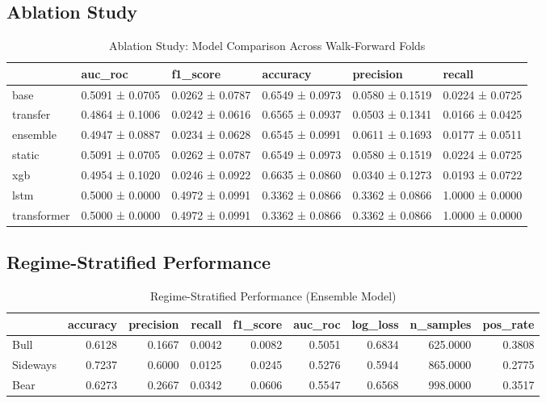 \documentclass[12pt,a4paper]{article}
\begin{document}
\subsection{Ablation Study}

\begin{table}
\caption{Ablation Study: Model Comparison Across Walk-Forward Folds}
\label{tab:ablation}
\begin{tabular}{llllll}
\toprule
 & auc_roc & f1_score & accuracy & precision & recall \\
\midrule
base & 0.5091 ± 0.0705 & 0.0262 ± 0.0787 & 0.6549 ± 0.0973 & 0.0580 ± 0.1519 & 0.0224 ± 0.0725 \\
transfer & 0.4864 ± 0.1006 & 0.0242 ± 0.0616 & 0.6565 ± 0.0937 & 0.0503 ± 0.1341 & 0.0166 ± 0.0425 \\
ensemble & 0.4947 ± 0.0887 & 0.0234 ± 0.0628 & 0.6545 ± 0.0991 & 0.0611 ± 0.1693 & 0.0177 ± 0.0511 \\
static & 0.5091 ± 0.0705 & 0.0262 ± 0.0787 & 0.6549 ± 0.0973 & 0.0580 ± 0.1519 & 0.0224 ± 0.0725 \\
xgb & 0.4954 ± 0.1020 & 0.0246 ± 0.0922 & 0.6635 ± 0.0860 & 0.0340 ± 0.1273 & 0.0193 ± 0.0722 \\
lstm & 0.5000 ± 0.0000 & 0.4972 ± 0.0991 & 0.3362 ± 0.0866 & 0.3362 ± 0.0866 & 1.0000 ± 0.0000 \\
transformer & 0.5000 ± 0.0000 & 0.4972 ± 0.0991 & 0.3362 ± 0.0866 & 0.3362 ± 0.0866 & 1.0000 ± 0.0000 \\
\bottomrule
\end{tabular}
\end{table}


\subsection{Regime-Stratified Performance}

\begin{table}
\caption{Regime-Stratified Performance (Ensemble Model)}
\label{tab:regime}
\begin{tabular}{lrrrrrrrr}
\toprule
 & accuracy & precision & recall & f1_score & auc_roc & log_loss & n_samples & pos_rate \\
\midrule
Bull & 0.6128 & 0.1667 & 0.0042 & 0.0082 & 0.5051 & 0.6834 & 625.0000 & 0.3808 \\
Sideways & 0.7237 & 0.6000 & 0.0125 & 0.0245 & 0.5276 & 0.5944 & 865.0000 & 0.2775 \\
Bear & 0.6273 & 0.2667 & 0.0342 & 0.0606 & 0.5547 & 0.6568 & 998.0000 & 0.3517 \\
\bottomrule
\end{tabular}
\end{table}
\end{document}

